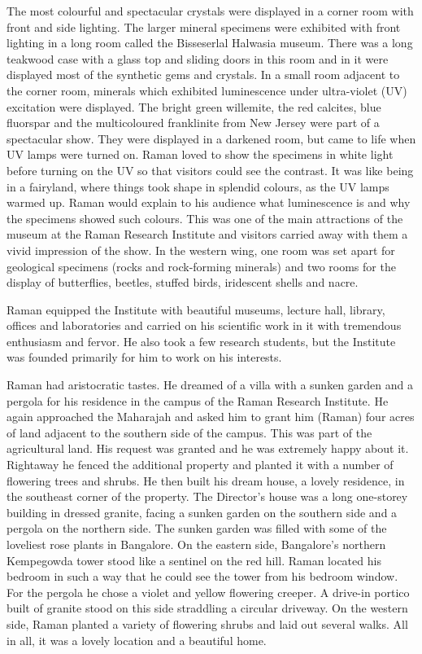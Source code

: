 The most colourful and spectacular crystals were displayed
in a corner room with front and side lighting. The larger mineral
specimens were exhibited with front lighting in a long room called
the Bisseserlal Halwasia museum. There was a long teakwood
case with a glass top and sliding doors in this room and in it were
displayed most of the synthetic gems and crystals. In a small room
adjacent to the corner room, minerals which exhibited
luminescence under ultra-violet (UV) excitation were displayed.
The bright green willemite, the red calcites, blue fluorspar and
the multicoloured franklinite from New Jersey were part of a
spectacular show. They were displayed in a darkened room, but
came to life when UV lamps were turned on. Raman loved to
show the specimens in white light before turning on the UV so
that visitors could see the contrast. It was like being in a fairyland,
where things took shape in splendid colours, as the UV lamps
warmed up. Raman would explain to his audience what
luminescence is and why the specimens showed such colours.
This was one of the main attractions of the museum at the Raman
Research Institute and visitors carried away with them a vivid
impression of the show. In the western wing, one room was set
apart for geological specimens (rocks and rock-forming minerals)
and two rooms for the display of butterflies, beetles, stuffed birds,
iridescent shells and nacre.

Raman equipped the Institute with beautiful museums, 
lecture hall, library, offices and laboratories and carried on his scientific work in it with tremendous enthusiasm and fervor. He also took a few research students, but the Institute was founded primarily for him to work on his interests. 

Raman had aristocratic tastes. He dreamed of a villa with a sunken garden and a pergola for his residence in the campus of the Raman Research Institute. He again approached the Maharajah and asked him to grant him (Raman) four acres of land adjacent to the southern side of the campus. This was part of the agricultural land. His request was granted and he was
extremely happy about it. Rightaway he fenced the additional
property and planted it with a number of flowering trees and
shrubs. He then built his dream house, a lovely residence, in the
southeast corner of the property. The Director's house was a long
one-storey building in dressed granite, facing a sunken garden
on the southern side and a pergola on the northern side.
The sunken garden was filled with some of the loveliest rose plants
in Bangalore. On the eastern side, Bangalore's northern
Kempegowda tower stood like a sentinel on the red hill. Raman
located his bedroom in such a way that he could see the tower
from his bedroom window. For the pergola he chose a violet and
yellow flowering creeper. A drive-in portico built of granite stood
on this side straddling a circular driveway. On the western side,
Raman planted a variety of flowering shrubs and laid out several
walks. All in all, it was a lovely location and a beautiful home.

